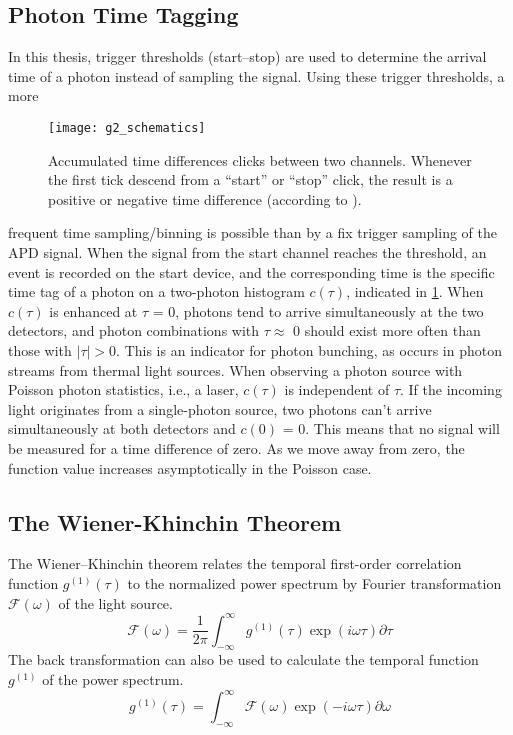 \subsection{Photon Time Tagging}
In this thesis, trigger thresholds (start--stop) are used to determine the arrival time of a photon instead of sampling the signal. Using these trigger thresholds, a more
\begin{figure}[htp]
	\centering
	\texttt{[image: g2\_schematics]}
	\caption{Accumulated time differences clicks between two channels. Whenever the first tick descend from a “start” or “stop” click, the result is a positive or negative time difference (according to \cite{swabian_instruments_time_2021}).}
	\label{fig:CorrelationShematics}
\end{figure}
\noindent frequent time sampling/binning is possible than by a fix trigger sampling of the \ac{APD} signal. When the signal from the start channel reaches the threshold, an event is recorded on the start device, and the corresponding time is the specific time tag of a photon on a two-photon histogram $c(\tau)$, indicated in \cref{fig:CorrelationShematics}. When $c(\tau)$ is enhanced at $\tau$ = \num{0}, photons tend to arrive simultaneously at the two detectors, and photon combinations with $\tau\approx$ \num{0} should exist more often than those with $|\tau|>$\num{0}. This is an indicator for photon bunching, as occurs in photon streams from thermal light sources. When observing a photon source with Poisson photon statistics, i.e., a laser, $c(\tau)$ is independent of $\tau$. If the incoming light originates from a single-photon source, two photons can't arrive simultaneously at both detectors and $c(0)$ = \num{0}. This means that no signal will be measured for a time difference of zero. As we move away from zero, the function value increases asymptotically in the Poisson case. 

\subsection{The Wiener-Khinchin Theorem}\label{sec:Khinchin}
The Wiener--Khinchin theorem relates the temporal first-order correlation function $g^{(1)}(\tau)$ to the normalized power spectrum by Fourier transformation $\mathcal{F}(\omega)$ of the light source.
\begin{equation}\label{eq:WienerForward}
	\mathcal{F}(\omega)=\dfrac{1}{2\pi}\int_{-\infty}^{\infty}g^{(1)}(\tau)\exp{(i\omega \tau)}\partial\tau
\end{equation}
The back transformation can also be used to calculate the temporal function $g^{(1)}$ of the power spectrum.
\begin{equation}\label{eq:WienerBackward}
	g^{(1)}(\tau)=\int_{-\infty}^{\infty}\mathcal{F}(\omega)\exp{(-i\omega \tau)}\partial\omega
\end{equation}

